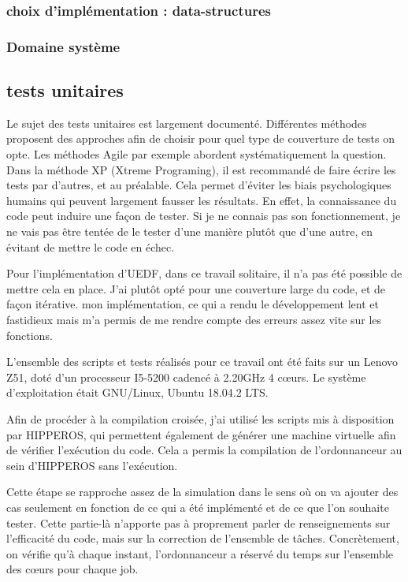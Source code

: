 		\subsubsection{choix d'implémentation : data-structures}
		\subsubsection{Domaine système}
		
	\subsection{tests unitaires}
	Le sujet des tests unitaires est largement documenté.  Différentes méthodes 
	proposent des approches afin de choisir pour quel type de couverture de tests on opte.
	Les méthodes Agile par exemple abordent systématiquement la question. Dans la méthode XP (Xtreme Programing),
	il est recommandé de faire écrire les tests par d'autres, et au préalable. Cela permet d'éviter les biais 
	psychologiques humains qui peuvent largement fausser les résultats. En effet, 
	la connaissance du code peut induire une façon de tester. Si je ne connais pas son fonctionnement, 
	je ne vais pas être tentée de le tester d'une manière plutôt que d'une autre, en évitant de mettre 
	le code en échec.
	
	
	Pour l'implémentation d'UEDF, dans ce travail solitaire, il n'a pas été possible de mettre cela en place.
	J'ai plutôt opté pour une couverture large du code, et de façon itérative. 	
	mon implémentation, ce qui a rendu le développement lent et fastidieux mais m'a permis de me rendre compte des 
	erreurs assez vite sur les fonctions.
	
	
	L'ensemble des scripts et tests réalisés pour ce travail ont été faits sur un 
	Lenovo Z51, doté d'un processeur I5-5200 cadencé à 2.20GHz 4 cœurs. 
	Le système d'exploitation était GNU/Linux, Ubuntu 18.04.2 LTS. 
	
	Afin de procéder à la compilation croisée, j'ai utilisé les scripts mis à disposition par HIPPEROS, 
	qui permettent également de générer une machine virtuelle afin de vérifier l'exécution du code. 
	Cela a permis la compilation de l'ordonnanceur au sein d'HIPPEROS sans l'exécution.
	
	Cette étape se rapproche assez de la simulation dans le sens où on va ajouter des cas seulement 
	en fonction de ce qui a été implémenté et de ce que l'on souhaite tester. Cette partie-là n'apporte pas 
	à proprement parler de renseignements sur l'efficacité du code, mais sur la correction de l'ensemble de tâches.
	Concrètement, on vérifie qu'à chaque instant, l'ordonnanceur a réservé du temps sur l'ensemble des cœurs 
	pour chaque job. 
	
